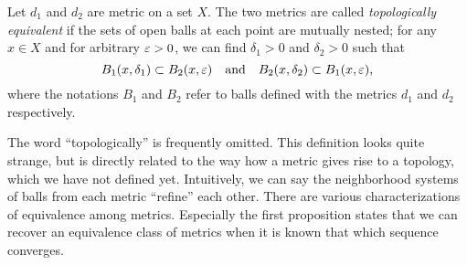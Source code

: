 \documentclass{../crs}
\begin{document}
\begin{defn}
Let $d_1$ and $d_2$ are metric on a set $X$.
The two metrics are called \emph{topologically equivalent} if the sets of open balls at each point are mutually nested;
for any $x\in X$ and for arbitrary $\varepsilon>0$, we can find $\delta_1>0$ and $\delta_2>0$ such that
\[B_1(x,\delta_1)\subset B_2(x,\varepsilon)\quad\text{and}\quad B_2(x,\delta_2)\subset B_1(x,\varepsilon),\]
where the notations $B_1$ and $B_2$ refer to balls defined with the metrics $d_1$ and $d_2$ respectively.
\end{defn}

The word ``topologically'' is frequently omitted.
This definition looks quite strange, but is directly related to the way how a metric gives rise to a topology, which we have not defined yet.
Intuitively, we can say the neighborhood systems of balls from each metric ``refine'' each other.
There are various characterizations of equivalence among metrics.
Especially the first proposition states that we can recover an equivalence class of metrics when it is known that which sequence converges.
\end{document}
